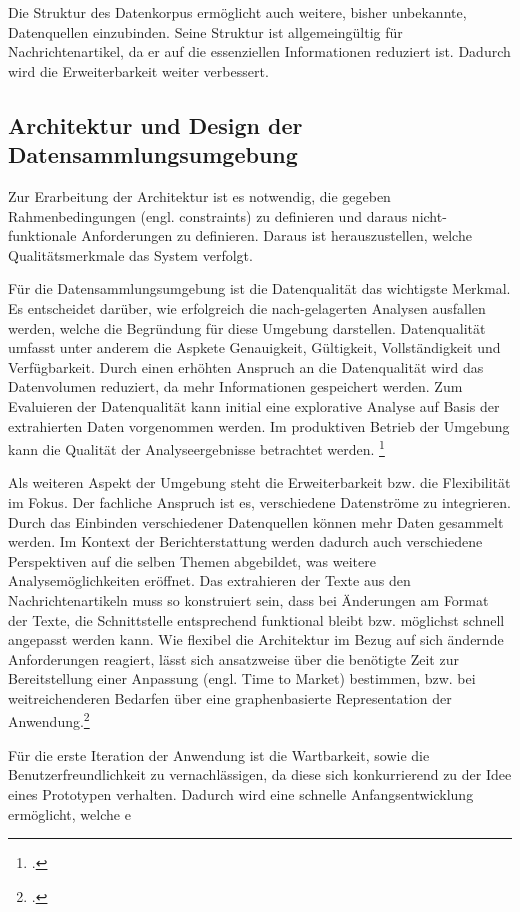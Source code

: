 Die Struktur des Datenkorpus ermöglicht auch weitere, bisher unbekannte, Datenquellen einzubinden. Seine Struktur ist allgemeingültig für Nachrichtenartikel, da er auf die essenziellen Informationen reduziert ist. 
Dadurch wird die Erweiterbarkeit weiter verbessert.

\newpage
\subsection{Architektur und Design der Datensammlungsumgebung}
Zur Erarbeitung der Architektur ist es notwendig, die gegeben Rahmenbedingungen (engl. constraints) zu definieren und daraus nicht- funktionale Anforderungen zu definieren. Daraus ist herauszustellen, welche Qualitätsmerkmale das System verfolgt. 

Für die Datensammlungsumgebung ist die Datenqualität das wichtigste Merkmal. Es entscheidet darüber, wie erfolgreich die nach-gelagerten Analysen ausfallen werden, welche die Begründung für diese Umgebung darstellen. Datenqualität umfasst unter anderem die Aspkete Genauigkeit, Gültigkeit, Vollständigkeit und Verfügbarkeit.
Durch einen erhöhten Anspruch an die Datenqualität wird das Datenvolumen reduziert, da mehr Informationen gespeichert werden. Zum Evaluieren der Datenqualität kann initial eine explorative Analyse auf Basis der extrahierten Daten vorgenommen werden. Im produktiven Betrieb der Umgebung kann die Qualität der Analyseergebnisse betrachtet werden. \footcite[Vgl.][]{Kilkenny.Data.2018}

Als weiteren Aspekt der Umgebung steht die Erweiterbarkeit bzw. die Flexibilität im Fokus. Der fachliche Anspruch ist es, verschiedene Datenströme zu integrieren. Durch das Einbinden verschiedener Datenquellen können mehr Daten gesammelt werden. Im Kontext der Berichterstattung werden dadurch auch verschiedene Perspektiven auf die selben Themen abgebildet, was weitere Analysemöglichkeiten eröffnet. Das extrahieren der Texte aus den Nachrichtenartikeln muss so konstruiert sein, dass  bei Änderungen am Format der Texte, die Schnittstelle entsprechend funktional bleibt bzw. möglichst schnell angepasst werden kann. Wie flexibel die Architektur im Bezug auf sich ändernde Anforderungen reagiert, lässt sich ansatzweise über die benötigte Zeit zur Bereitstellung einer Anpassung (engl. Time to Market) bestimmen, bzw. bei weitreichenderen Bedarfen über eine graphenbasierte Representation der Anwendung.\footcite[Vgl.][]{Broniatowski.Measuring.2016}{}{}

Für die erste Iteration der Anwendung ist die Wartbarkeit, sowie die Benutzerfreundlichkeit zu vernachlässigen, da diese sich konkurrierend zu der Idee eines Prototypen verhalten. Dadurch wird eine schnelle Anfangsentwicklung ermöglicht, welche e


